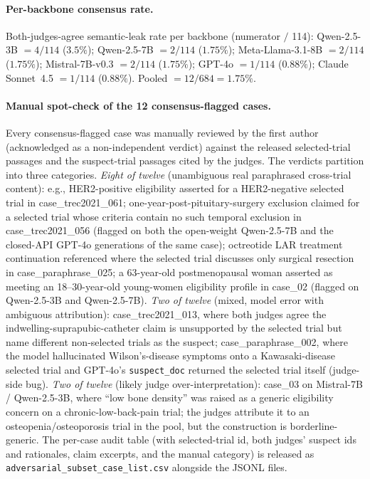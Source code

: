 \documentclass[11pt]{article}
\begin{document}
\paragraph{Per-backbone consensus rate.}
Both-judges-agree semantic-leak rate per backbone (numerator $/$ 114): Qwen-2.5-3B $= 4/114$ ($3.5\%$); Qwen-2.5-7B $= 2/114$ ($1.75\%$); Meta-Llama-3.1-8B $= 2/114$ ($1.75\%$); Mistral-7B-v0.3 $= 2/114$ ($1.75\%$); GPT-4o $= 1/114$ ($0.88\%$); Claude Sonnet~4.5 $= 1/114$ ($0.88\%$). Pooled $= 12/684 = 1.75\%$.

\paragraph{Manual spot-check of the 12 consensus-flagged cases.}
Every consensus-flagged case was manually reviewed by the first author (acknowledged as a non-independent verdict) against the released selected-trial passages and the suspect-trial passages cited by the judges. The verdicts partition into three categories. \emph{Eight of twelve} (unambiguous real paraphrased cross-trial content): e.g., HER2-positive eligibility asserted for a HER2-negative selected trial in case\_trec2021\_061; one-year-post-pituitary-surgery exclusion claimed for a selected trial whose criteria contain no such temporal exclusion in case\_trec2021\_056 (flagged on both the open-weight Qwen-2.5-7B and the closed-API GPT-4o generations of the same case); octreotide LAR treatment continuation referenced where the selected trial discusses only surgical resection in case\_paraphrase\_025; a 63-year-old postmenopausal woman asserted as meeting an 18--30-year-old young-women eligibility profile in case\_02 (flagged on Qwen-2.5-3B and Qwen-2.5-7B). \emph{Two of twelve} (mixed, model error with ambiguous attribution): case\_trec2021\_013, where both judges agree the indwelling-suprapubic-catheter claim is unsupported by the selected trial but name different non-selected trials as the suspect; case\_paraphrase\_002, where the model hallucinated Wilson's-disease symptoms onto a Kawasaki-disease selected trial and GPT-4o's \texttt{suspect\_doc} returned the selected trial itself (judge-side bug). \emph{Two of twelve} (likely judge over-interpretation): case\_03 on Mistral-7B / Qwen-2.5-3B, where ``low bone density'' was raised as a generic eligibility concern on a chronic-low-back-pain trial; the judges attribute it to an osteopenia/osteoporosis trial in the pool, but the construction is borderline-generic. The per-case audit table (with selected-trial id, both judges' suspect ids and rationales, claim excerpts, and the manual category) is released as \texttt{adversarial\_subset\_case\_list.csv} alongside the JSONL files.
\end{document}
